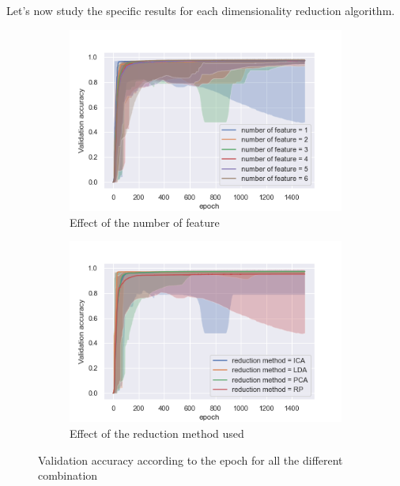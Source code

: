 \documentclass[twocolumn, 10pt]{article}
\begin{document}
			Let's now study the specific results for each dimensionality reduction algorithm.
			\begin{figure}[h]
				\centering
				\begin{subfigure}[t]{0.7\columnwidth}
					\centering
					\includegraphics[width=\linewidth]{../graphics/all_epoch_val_categorical_accuracy_number_of_feature.png}
					\caption{Effect of the number of feature}
					\label{fig:per_all_nf}
				\end{subfigure}
				\begin{subfigure}[t]{0.7\columnwidth}
					\centering
					\includegraphics[width=\linewidth]{../graphics/all_epoch_val_categorical_accuracy_reduction_method.png}
					\caption{Effect of the reduction method used}
					\label{fig:per_all_rm}
				\end{subfigure}
				\caption{Validation accuracy according to the epoch for all the different combination}
				\label{fig:per_all}
			\end{figure}
\end{document}
